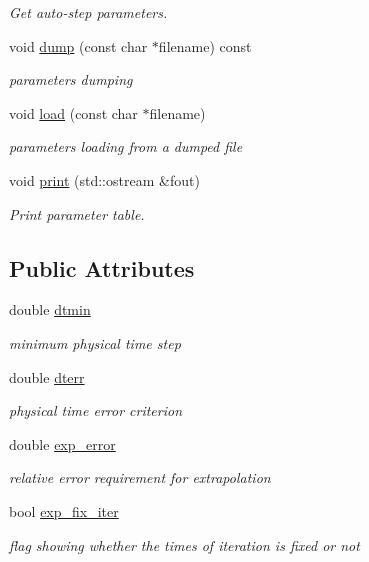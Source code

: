 \begin{DoxyCompactItemize}
\begin{DoxyCompactList}\small\item\em Get auto-\/step parameters. \end{DoxyCompactList}\item 
void \hyperlink{classARC_1_1chainpars_a926438a652307d24bd8a03b0ca926382}{dump} (const char $\ast$filename) const
\begin{DoxyCompactList}\small\item\em parameters dumping \end{DoxyCompactList}\item 
void \hyperlink{classARC_1_1chainpars_aa42cf56363fba1701a26cc445eda01d5}{load} (const char $\ast$filename)
\begin{DoxyCompactList}\small\item\em parameters loading from a dumped file \end{DoxyCompactList}\item 
void \hyperlink{classARC_1_1chainpars_a3bd667353d49614c52ad6c965a7480f3}{print} (std\+::ostream \&fout)
\begin{DoxyCompactList}\small\item\em Print parameter table. \end{DoxyCompactList}\end{DoxyCompactItemize}
\subsection*{Public Attributes}
\begin{DoxyCompactItemize}
\item 
double \hyperlink{classARC_1_1chainpars_ac414014d19915aecb35245ba11649c2e}{dtmin}
\begin{DoxyCompactList}\small\item\em minimum physical time step \end{DoxyCompactList}\item 
double \hyperlink{classARC_1_1chainpars_ad3a3e8f9199180ec82b9c257b1e8570e}{dterr}
\begin{DoxyCompactList}\small\item\em physical time error criterion \end{DoxyCompactList}\item 
double \hyperlink{classARC_1_1chainpars_a7ee477ebe8b1d67457891ab58560c074}{exp\+\_\+error}
\begin{DoxyCompactList}\small\item\em relative error requirement for extrapolation \end{DoxyCompactList}\item 
bool \hyperlink{classARC_1_1chainpars_a3f16e6ea9497e294265c4a17df0394ba}{exp\+\_\+fix\+\_\+iter}
\begin{DoxyCompactList}\small\item\em flag showing whether the times of iteration is fixed or not \end{DoxyCompactList}\end{DoxyCompactItemize}
